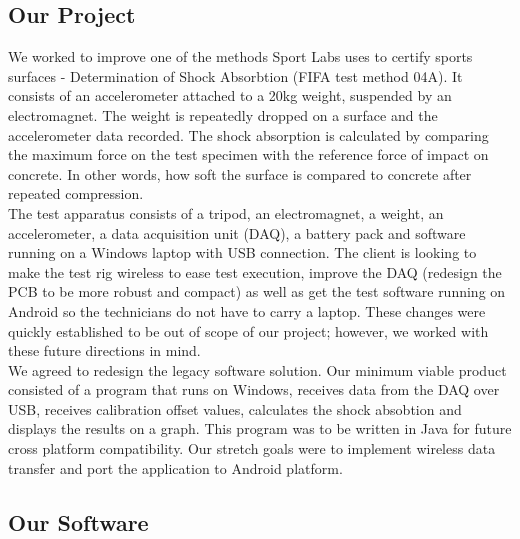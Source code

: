 \documentclass{l3proj}
\begin{document}
\subsection{Our Project}
We worked to improve one of the methods Sport Labs uses to certify sports surfaces - Determination of Shock Absorbtion (FIFA test method 04A). It consists of an accelerometer attached to a 20kg weight, suspended by an electromagnet. The weight is repeatedly dropped on a surface and the accelerometer data recorded. The shock absorption is calculated by comparing the maximum force on the test specimen with the reference force of impact on concrete\cite{fifa}. In other words, how soft the surface is compared to concrete after repeated compression. \\
The test apparatus consists of a tripod, an electromagnet, a weight, an accelerometer, a data acquisition unit (DAQ), a battery pack and software running on a Windows laptop with USB connection. The client is looking to make the test rig wireless to ease test execution, improve the DAQ (redesign the PCB to be more robust and compact) as well as get the test software running on Android so the technicians do not have to carry a laptop. These changes were quickly established to be out of scope of our project; however, we worked with these future directions in mind. \\
We agreed to redesign the legacy software solution. Our minimum viable product consisted of a program that runs on Windows, receives data from the DAQ over USB, receives calibration offset values, calculates the shock absobtion and displays the results on a graph. This program was to be written in Java for future cross platform compatibility. Our stretch goals were to implement wireless data transfer and port the application to Android platform.


\subsection{Our Software}
\end{document}
